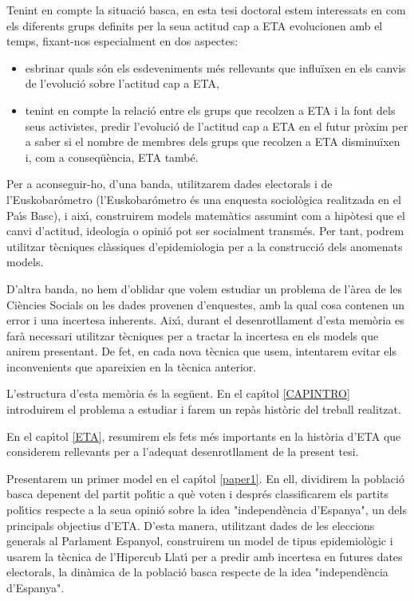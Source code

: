 Tenint en compte la situaci\'o basca, en esta tesi doctoral estem interessats en com els diferents grups definits per la seua actitud cap a ETA evolucionen amb el temps, fixant-nos especialment en dos aspectes:

\begin{itemize}
\item esbrinar quals s\'on els esdeveniments m\'es rellevants que influ\"{i}xen en els canvis de l'evoluci\'o sobre l'actitud cap a ETA,
\item tenint en compte la relaci\'o entre els grups que recolzen a ETA i la font dels seus activistes, predir l'evoluci\'o de l'actitud cap a ETA en el futur pr\`oxim per a saber si el nombre de membres dels grups que recolzen a ETA disminu\"{i}xen i, com a conseq\"{u}\`encia, ETA tamb\'e.
\end{itemize}

Per a aconseguir-ho, d'una banda, utilitzarem dades electorals i de l'Eusko\-bar\'ometro (l'Euskobar\'ometro \'es una enquesta sociol\`ogica realitzada en el Pa\'{\i}s Basc), i aix\'{\i}, construirem models matem\`atics assumint com a hip\`otesi que el canvi d'actitud, ideologia o opini\'o pot ser socialment transm\'es. Per tant, podrem utilitzar t\`ecniques cl\`assiques d'epidemiologia per a la cons\-trucci\'o dels anomenats models.

D'altra banda, no hem d'oblidar que volem estudiar un problema de l'\`area de les Ci\`encies Socials on les dades provenen d'enquestes, amb la qual cosa contenen un error i una incertesa inherents. Aix\'{\i}, durant el desenrotllament d'esta mem\`oria es far\`a necessari utilitzar t\`ecniques per a tractar la incertesa en els models que anirem presentant. De fet, en cada nova t\`ecnica que usem, intentarem evitar els inconvenients que apareixien en la t\`ecnica anterior.

L'estructura d'esta mem\`oria \'es la seg\"{u}ent. En el cap\'{\i}tol \ref{CAPINTRO} introduirem el problema a estudiar i farem un rep\`as hist\`oric del treball realitzat.

En el cap\'{\i}tol \ref{ETA}, resumirem els fets m\'es importants en la hist\`oria d'ETA que considerem rellevants per a l'adequat desenrotllament de la present tesi.

Presentarem un primer model en el cap\'{\i}tol \ref{paper1}. En ell, dividirem la poblaci\'o basca depenent del partit pol\'{\i}tic a qu\`e voten i despr\'es classificarem els partits pol\'{\i}tics respecte a la seua opini\'o sobre la idea "independ\`encia d'Espanya", un dels principals objectius d'ETA. D'esta manera, utilitzant dades de les eleccions generals al Parlament Espanyol, construirem un model de tipus epidemiol\`ogic i usarem la t\`ecnica de l'Hipercub Llat\'{\i} per a predir amb incertesa en futures dates electorals, la din\`amica de la poblaci\'o basca respecte de la idea "independ\`encia d'Espanya".

